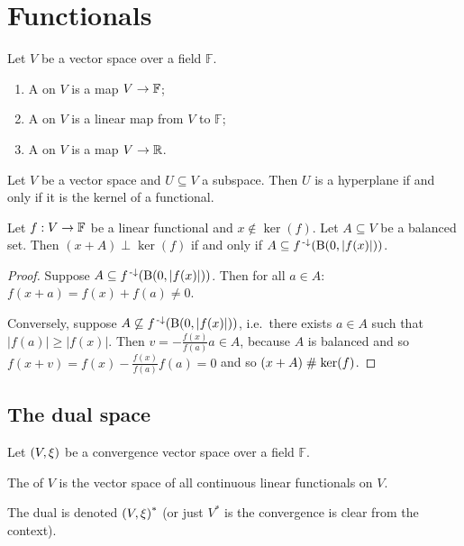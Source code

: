 \section{Functionals}
\begin{definition}
Let $V$ be a vector space over a field $\mathbb{F}$.
\begin{enumerate}
\item A  on $V$ is a map $V\to \mathbb{F}$;
\item A  on $V$ is a linear map from $V$ to $\mathbb{F}$;
\item A  on $V$ is a map $V\to \mathbb{R}$.
\end{enumerate}
\end{definition}

\begin{lemma} \label{kernelHyperplane}
Let $V$ be a vector space and $U\subseteq V$ a subspace. Then $U$ is a hyperplane \textup{if and only if} it is the kernel of a functional.
\end{lemma}

\begin{lemma} \label{functionalBoundedNeighbourhood}
Let $f: V\to \mathbb{F}$ be a linear functional and $x\notin \ker(f)$. Let $A\subseteq V$ be a balanced set. Then $(x+A)\perp \ker(f)$ \textup{if and only if} $A \subseteq f^{{\text{\hspace{0.15em}-}\downarrow}}(\operatorname{B}(0,|f(x)|))$.
\end{lemma}
\begin{proof}
Suppose $A \subseteq f^{{\text{\hspace{0.15em}-}\downarrow}}(\operatorname{B}(0,|f(x)|))$. Then for all $a\in A$: $f(x+a) = f(x) + f(a) \neq 0$.

Conversely, suppose $A \not\subseteq f^{{\text{\hspace{0.15em}-}\downarrow}}(\operatorname{B}(0,|f(x)|))$, i.e.\ there exists $a\in A$ such that $|f(a)| \geq |f(x)|$. Then $v= -\frac{f(x)}{f(a)}a\in A$, because $A$ is balanced and so $f(x+ v) = f(x)-\frac{f(x)}{f(a)}f(a) = 0$ and so $(x+A) \mathrel{\#} \ker(f)$.
\end{proof}

\subsection{The dual space}
\begin{definition}
Let $\left( V,\xi \right)$ be a convergence vector space over a field $\mathbb{F}$.

The  of $V$ is the vector space of all continuous linear functionals on $V$.

The dual is denoted $\left( V,\xi \right)^{*}$ (or just $V^*$ is the convergence is clear from the context).
\end{definition}

